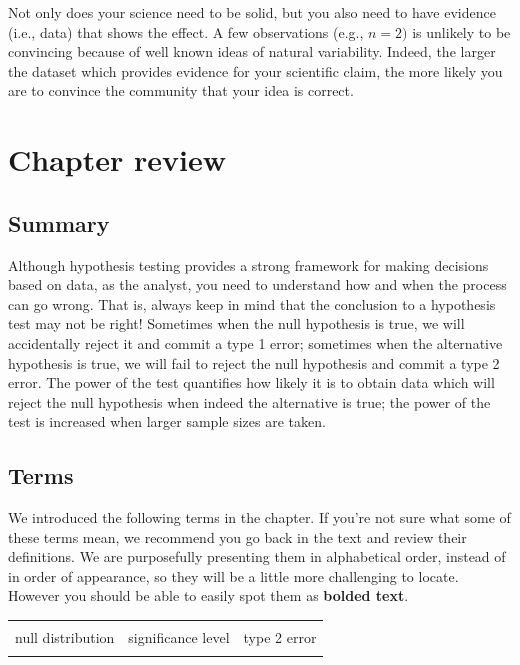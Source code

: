 \documentclass[
  10pt,
  openany]{book}
\begin{document}
Not only does your science need to be solid, but you also need to have evidence (i.e., data) that shows the effect.
A few observations (e.g., \(n = 2)\) is unlikely to be convincing because of well known ideas of natural variability.
Indeed, the larger the dataset which provides evidence for your scientific claim, the more likely you are to convince the community that your idea is correct.

\clearpage

\hypertarget{chp15-review}{%
\section{Chapter review}\label{chp15-review}}

\hypertarget{summary-8}{%
\subsection{Summary}\label{summary-8}}

Although hypothesis testing provides a strong framework for making decisions based on data, as the analyst, you need to understand how and when the process can go wrong.
That is, always keep in mind that the conclusion to a hypothesis test may not be right!
Sometimes when the null hypothesis is true, we will accidentally reject it and commit a type 1 error; sometimes when the alternative hypothesis is true, we will fail to reject the null hypothesis and commit a type 2 error.
The power of the test quantifies how likely it is to obtain data which will reject the null hypothesis when indeed the alternative is true; the power of the test is increased when larger sample sizes are taken.

\hypertarget{terms-8}{%
\subsection{Terms}\label{terms-8}}

We introduced the following terms in the chapter.
If you're not sure what some of these terms mean, we recommend you go back in the text and review their definitions.
We are purposefully presenting them in alphabetical order, instead of in order of appearance, so they will be a little more challenging to locate.
However you should be able to easily spot them as \textbf{bolded text}.

\begin{tabu} to 
\toprule
{} &  & \\
null distribution & significance level & type 2 error\\
 &  & \\
\bottomrule
\end{tabu}
\end{document}
